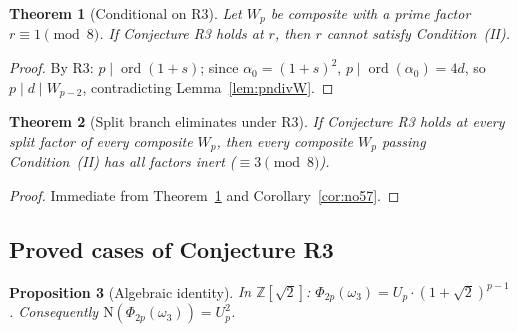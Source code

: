 \documentclass[11pt]{amsart}
\theoremstyle{plain}
\newtheorem{theorem}{Theorem}[section]
\newtheorem{proposition}[theorem]{Proposition}
\theoremstyle{definition}
\theoremstyle{remark}
\numberwithin{equation}{section}
\newcommand{\ord}{\operatorname{ord}}
\newcommand{\Z}{\mathbb{Z}}
\begin{document}
\begin{theorem}[Conditional on R3]\label{thm:cond-R3}
Let $W_p$ be composite with a prime factor $r \equiv 1 \pmod 8$. If Conjecture R3 holds at $r$, then $r$ cannot satisfy Condition~(II).
\end{theorem}

\begin{proof}
By R3: $p \mid \ord(1 + s)$; since $\alpha_0 = (1+s)^2$, $p \mid \ord(\alpha_0) = 4d$, so $p \mid d \mid W_{p-2}$, contradicting Lemma~\ref{lem:pndivW}.
\end{proof}

\begin{theorem}[Split branch eliminates under R3]\label{thm:R3-eliminates}
If Conjecture R3 holds at every split factor of every composite $W_p$, then every composite $W_p$ passing Condition~(II) has all factors inert ($\equiv 3 \pmod 8$).
\end{theorem}

\begin{proof}
Immediate from Theorem~\ref{thm:cond-R3} and Corollary~\ref{cor:no57}.
\end{proof}

\subsection{Proved cases of Conjecture R3}

\begin{proposition}[Algebraic identity]\label{prop:alg-identity}
In $\Z[\sqrt 2]$: $\Phi_{2p}(\omega_3) = U_p \cdot (1 + \sqrt 2)^{p-1}$. Consequently $\mathrm{N}(\Phi_{2p}(\omega_3)) = U_p^2$.
\end{proposition}
\end{document}
